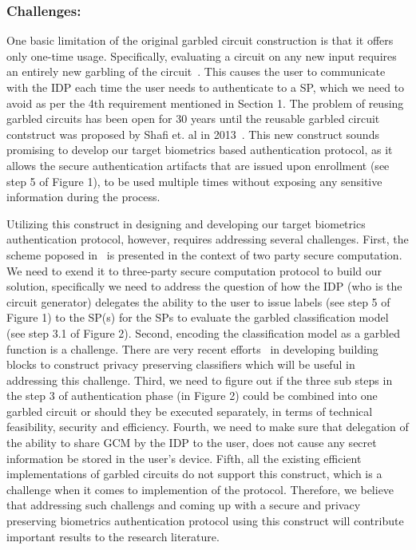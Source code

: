 \documentclass[10pt]{article}
\begin{document}
\subsubsection*{Challenges:}
One basic limitation of the original garbled circuit construction is that it offers only one-time usage. Specifically, evaluating a circuit on any 
new input requires an entirely new garbling of the circuit~\cite{reusablegc}. This causes the user to communicate with the IDP each time the user 
needs to authenticate to a SP, which we need to avoid as per the 4th requirement mentioned in Section 1. The problem of reusing garbled 
circuits has been open for 30 years until the reusable garbled circuit contstruct was proposed by Shafi et. al in 2013~\cite{reusablegc}. This new 
construct sounds promising to develop our target biometrics based authentication protocol, as it allows the secure authentication 
artifacts that are issued upon enrollment (see step 5 of Figure 1), to be used multiple times without exposing any sensitive information during the 
process.

Utilizing this construct in designing and developing our target biometrics authentication protocol, however, requires addressing several challenges. 
First, the scheme poposed in~\cite{reusablegc} is presented in the context of two party secure computation. We need to exend it to three-party 
secure computation protocol to build our solution, specifically we need to address the question of how the IDP (who is the circuit generator) 
delegates the ability to the user to issue labels (see step 5 of Figure 1) to the SP(s) for the SPs to evaluate the garbled classification model 
(see step 3.1 of Figure 2). 
Second, encoding the classification model as a garbled function is a challenge. There are very recent efforts~\cite{mlgc} in developing building 
blocks to construct privacy preserving classifiers which will be useful in addressing this challenge.
Third, we need to figure out if the three sub steps in the step 3 of authentication phase (in Figure 2) could be combined into one garbled circuit or 
should they be executed separately, in terms of technical feasibility, security and efficiency.
Fourth, we need to make sure that delegation of the ability to share GCM by the IDP to the user, does not cause any secret information be stored in 
the user's device.
Fifth, all the existing efficient implementations of garbled circuits do not support this construct, which is a challenge when it comes 
to implemention of the protocol. 
Therefore, we believe that addressing such challengs and coming up with a secure and privacy preserving biometrics authentication 
protocol using this construct will contribute important results to the research literature. 
\end{document}
